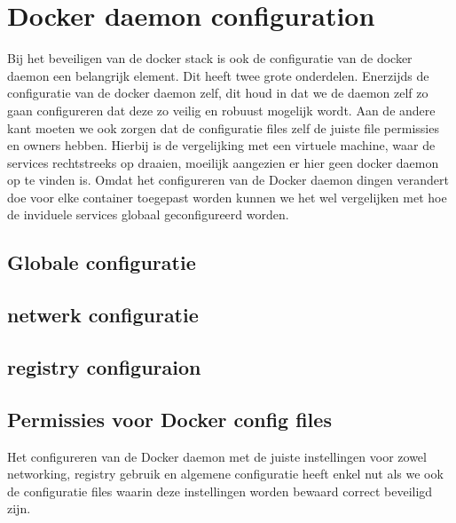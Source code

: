 \section{Docker daemon configuration}

Bij het beveiligen van de docker stack is ook de configuratie van de docker daemon een belangrijk element. Dit heeft twee grote onderdelen. Enerzijds de configuratie van de docker daemon zelf, dit houd in dat we de daemon zelf zo gaan configureren dat deze zo veilig en robuust mogelijk wordt. Aan de andere kant moeten we ook zorgen dat de configuratie files zelf de juiste file permissies en owners hebben. Hierbij is de vergelijking met een virtuele machine, waar de services rechtstreeks op draaien, moeilijk aangezien er hier geen docker daemon op te vinden is. Omdat het configureren van de Docker daemon dingen verandert doe voor elke container toegepast worden kunnen we het wel vergelijken met hoe de inviduele services globaal geconfigureerd worden.


\subsection{Globale configuratie}



\subsection{netwerk configuratie}




\subsection{registry configuraion}


\subsection{Permissies voor Docker config files}

Het configureren van de Docker daemon met de juiste instellingen voor zowel networking, registry gebruik en algemene configuratie heeft enkel nut als we ook de configuratie files waarin deze instellingen worden bewaard correct beveiligd zijn. 

% 

